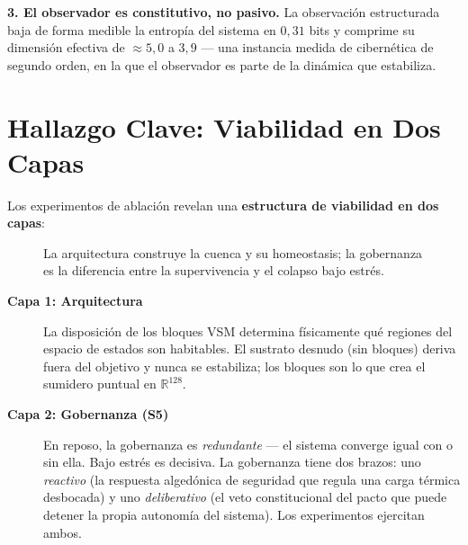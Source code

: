 \documentclass[11pt, a4paper]{article}
\newcommand{\R}{\mathbb{R}}
\begin{document}
\textbf{3. El observador es constitutivo, no pasivo.} La observación estructurada baja
de forma medible la entropía del sistema en $0{,}31$ bits y comprime su dimensión
efectiva de $\approx 5{,}0$ a $3{,}9$ --- una instancia medida de cibernética de
segundo orden, en la que el observador es parte de la dinámica que estabiliza.

\section*{Hallazgo Clave: Viabilidad en Dos Capas}

Los experimentos de ablación revelan una \textbf{estructura de viabilidad en dos
capas}:

\begin{figure}[h]
\centering
{}
\caption{La arquitectura construye la cuenca y su homeostasis; la gobernanza es la
diferencia entre la supervivencia y el colapso bajo estrés.}
\label{fig:dos_capas}
\end{figure}

\begin{description}
  \item[\textbf{Capa 1: Arquitectura}] La disposición de los bloques VSM determina
        físicamente qué regiones del espacio de estados son habitables. El sustrato
        desnudo (sin bloques) deriva fuera del objetivo y nunca se estabiliza; los
        bloques son lo que crea el sumidero puntual en $\R^{128}$.
  \item[\textbf{Capa 2: Gobernanza (S5)}] En reposo, la gobernanza es
        \emph{redundante} --- el sistema converge igual con o sin ella. Bajo estrés es
        decisiva. La gobernanza tiene dos brazos: uno \emph{reactivo} (la respuesta
        algedónica de seguridad que regula una carga térmica desbocada) y uno
        \emph{deliberativo} (el veto constitucional del pacto que puede detener la
        propia autonomía del sistema). Los experimentos ejercitan ambos.
\end{description}
\end{document}
